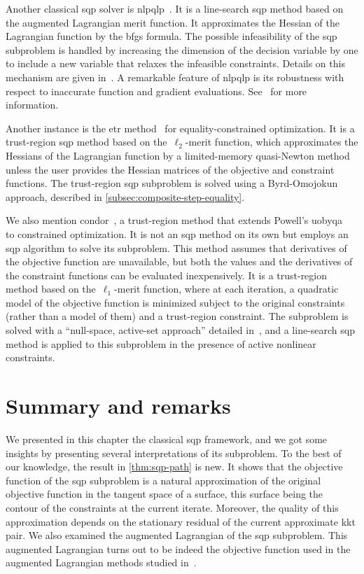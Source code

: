 Another classical \gls{sqp} solver is \gls{nlpqlp}~\cite{Schittkowski_2015}.
It is a line-search \gls{sqp} method based on the augmented Lagrangian merit function.
It approximates the Hessian of the Lagrangian function by the \gls{bfgs} formula.
The possible infeasibility of the \gls{sqp} subproblem is handled by increasing the dimension of the decision variable by one to include a new variable that relaxes the infeasible constraints.
Details on this mechanism are given in~\cite[Eq.~(9)]{Schittkowski_1986}.
A remarkable feature of \gls{nlpqlp} is its robustness with respect to inaccurate function and gradient evaluations.
See~\cite{Schittkowski_2015} for more information.

Another instance is the \gls{etr} method~\cite{Lalee_Nocedal_Plantenga_1998} for equality-constrained optimization.
It is a trust-region \gls{sqp} method based on the~$\ell_2$-merit function, which approximates the Hessians of the Lagrangian function by a limited-memory quasi-Newton method unless the user provides the Hessian matrices of the objective and constraint functions.
The trust-region \gls{sqp} subproblem is solved using a Byrd-Omojokun approach, described in \cref{subsec:composite-step-equality}.

We also mention \gls{condor}~\cite{Berghen_2004,Berghen_Bersini_2004}, a trust-region method that extends Powell's \gls{uobyqa}~\cite{Powell_2002} to constrained optimization.
It is not an \gls{sqp} method on its own but employs an \gls{sqp} algorithm to solve its subproblem.
This method assumes that derivatives of the objective function are unavailable, but both the values and the derivatives of the constraint functions can be evaluated inexpensively.
It is a trust-region method based on the~$\ell_1$-merit function, where at each iteration, a quadratic model of the objective function is minimized subject to the original constraints (rather than a model of them) and a trust-region constraint.
The subproblem is solved with a \enquote{null-space, active-set approach} detailed in~\cite[\S~9.3]{Berghen_2004}, and a line-search \gls{sqp} method is applied to this subproblem in the presence of active nonlinear constraints.

\section{Summary and remarks}

We presented in this chapter the classical \gls{sqp} framework, and we got some insights by presenting several interpretations of its subproblem.
To the best of our knowledge, the result in \cref{thm:sqp-path} is new.
It shows that the objective function of the \gls{sqp} subproblem is a natural approximation of the original objective function in the tangent space of a surface, this surface being the contour of the constraints at the current iterate.
Moreover, the quality of this approximation depends on the stationary residual of the current approximate \gls{kkt} pair.
We also examined the augmented Lagrangian of the \gls{sqp} subproblem.
This augmented Lagrangian turns out to be indeed the objective function used in the augmented Lagrangian methods studied in~\cite{Niu_Yuan_2010,Wang_Yuan_2014}.

